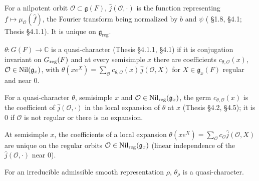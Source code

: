 \begin{definition}
\label{jHat}
\leanok
For a nilpotent orbit $\mathcal O\subset\mathfrak g(F)$, $\hat{j}(\mathcal O,\cdot)$ is the function
representing $f\mapsto\mu_{\mathcal O}(\hat f)$, the Fourier transform being normalized by $b$ and $\psi$
(\cite{BP} \S1.8, \S4.1; Thesis \S4.1.1). It is unique on $\mathfrak g_{\mathrm{reg}}$.
\end{definition}

\begin{definition}
\label{IsQuasiCharacter}
\leanok
{}
$\theta: G(F)\to\mathbb C$ is a quasi-character (Thesis \S4.1.1, \cite{BP} \S4.1) if it is conjugation
invariant on $G_{\mathrm{reg}}(F)$ and at every semisimple $x$ there are coefficients $c_{\theta,\mathcal O}(x)$,
$\mathcal O\in\mathrm{Nil}(\mathfrak g_x)$, with
$\theta(xe^X)=\sum_{\mathcal O}c_{\theta,\mathcal O}(x)\,\hat j(\mathcal O,X)$ for $X\in\mathfrak g_x(F)$
regular and near $0$.
\end{definition}

\begin{definition}[Germs]
\label{germ}
\leanok
{}
For a quasi-character $\theta$, semisimple $x$ and $\mathcal O\in\mathrm{Nil}_{\mathrm{reg}}(\mathfrak g_x)$, the germ
$c_{\theta,\mathcal O}(x)$ is the coefficient of $\hat j(\mathcal O,\cdot)$ in the local expansion of $\theta$
at $x$ (Thesis \S4.2, \cite{BP} \S4.5); it is $0$ if $\mathcal O$ is not regular or there is no expansion.
\end{definition}

\begin{literature}
\label{LIT-germ_unique}
\leanok
{}
At semisimple $x$, the coefficients of a local expansion $\theta(xe^X)=\sum_{\mathcal O}c_{\mathcal O}\hat j(\mathcal O,X)$
are unique on the regular orbits $\mathcal O\in\mathrm{Nil}_{\mathrm{reg}}(\mathfrak g_x)$ (linear independence of the
$\hat j(\mathcal O,\cdot)$ near $0$).

\end{literature}

\begin{literature}
\label{LIT-hc_character_isQuasiCharacter_admissible}
\leanok
{}
For an irreducible admissible smooth representation $\rho$, $\theta_\rho$ is a quasi-character.

\end{literature}

